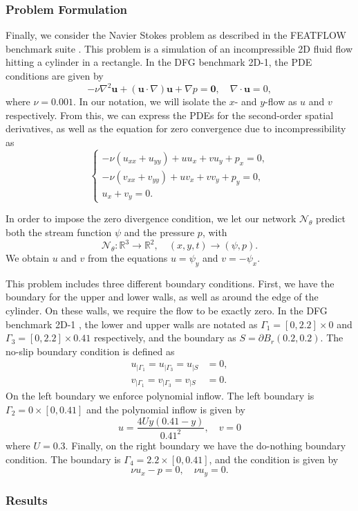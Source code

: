\subsubsection{Problem Formulation}
Finally, we consider the Navier Stokes problem as described in the FEATFLOW benchmark suite \cite{DFG}. This problem is a simulation of an incompressible 2D fluid flow hitting a cylinder in a rectangle. In the DFG benchmark 2D-1, the PDE conditions are given by
\begin{equation}
    -\nu \nabla^2 \mathbf{u} + (\mathbf{u} \cdot \nabla)\mathbf{u} + \nabla p = \mathbf{0}, \quad \nabla \cdot \mathbf{u} = 0,
\end{equation}
where $\nu = 0.001$. In our notation, we will isolate the $x$- and $y$-flow as $u$ and $v$ respectively. From this, we can express the PDEs for the second-order spatial derivatives, as well as the equation for zero convergence due to incompressibility as
\begin{equation}
\begin{cases}
-\nu(u_{xx} + u_{yy})+uu_x+vu_y+p_x = 0, \\
-\nu(v_{xx} + v_{yy})+uv_x+vv_y+p_y = 0, \\
u_x + v_y = 0.
\end{cases}
\end{equation}

In order to impose the zero divergence condition, we let our network $\mathcal{N}_\theta$ predict both the stream function $\psi$ and the pressure $p$, with
\begin{equation}
    \mathcal{N}_\theta : \mathbb{R}^3 \to \mathbb{R}^2, \quad (x,y,t)\to (\psi, p).
\end{equation}
We obtain $u$ and $v$ from the equations $u=\psi_y$ and $v=-\psi_x$.

This problem includes three different boundary conditions.
First, we have the boundary for the upper and lower walls, as well as around the edge of the cylinder.
On these walls, we require the flow to be exactly zero.
In the DFG benchmark 2D-1 \cite{DFG}, the lower and upper walls are notated as $\Gamma_1 = [0,2.2]\times 0$ and $\Gamma_3 = [0,2.2]\times 0.41$ respectively, and the boundary as $S=\partial B_r(0.2,0.2)$.
The no-slip boundary condition is defined as
\begin{align*}
    u_{|\Gamma_1} = u_{|\Gamma_3} = u_{|S} &= 0, \\
    v_{|\Gamma_1} = v_{|\Gamma_3} = v_{|S} &= 0.
\end{align*}
On the left boundary we enforce polynomial inflow.
The left boundary is $\Gamma_2 = 0\times [0,0.41]$ and the polynomial inflow is given by
\begin{equation*}
    u=\frac{4Uy(0.41-y)}{0.41^2}, \quad v=0
\end{equation*}
where $U=0.3$.
Finally, on the right boundary we have the do-nothing boundary condition.
The boundary is $\Gamma_4=2.2\times[0,0.41]$, and the condition is given by
\begin{equation*}
    \nu u_x - p = 0, \quad \nu u_y = 0.
\end{equation*}

\subsubsection{Results}